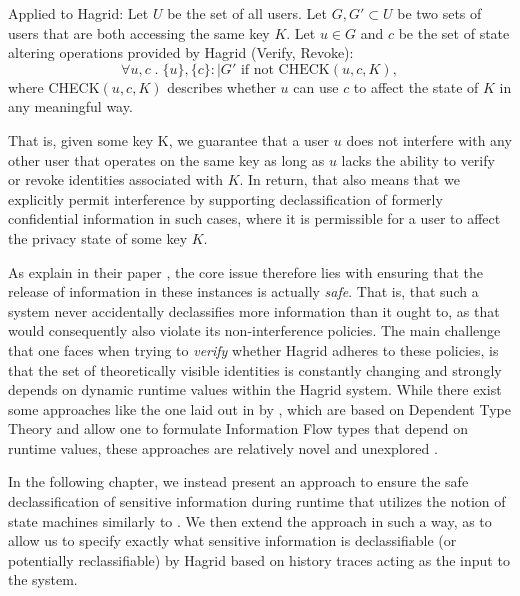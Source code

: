 Applied to Hagrid: Let \(U\) be the set of all users. Let \(G,G' \subset U\) be two sets of users that are both accessing the same key \(K\). Let \(u \in G\) and \(c\) be the set of state altering operations provided by Hagrid (Verify, Revoke): 
\[
    \forall u,c \;.\; \{u\}, \{c\} :\mid G' \text{ if not } \text{CHECK}(u,c,K),
\]
where CHECK\((u,c,K)\) describes whether \(u\) can use \(c\) to affect the state of \(K\) in any meaningful way.

That is, given some key K, we guarantee that a user \(u\) does not interfere with any other user that operates on the same key as long as \(u\) lacks the ability to verify or revoke identities associated with \(K\). 
In return, that also means that we explicitly permit interference by supporting declassification of formerly confidential information in such cases, where it is permissible for a user to affect the privacy state of some key \(K\).

As \citeauthor{declass_dim_prin} explain in their paper , the core issue therefore lies with ensuring that the release of information in these instances is actually \emph{safe}\cite{declass_dim_prin}. That is, that such a system never accidentally declassifies more information than it ought to, as that would consequently also violate its non-interference policies.
The main challenge that one faces when trying to \emph{verify} whether Hagrid adheres to these policies, is that the set of theoretically visible identities is constantly changing and strongly depends on dynamic runtime values within the Hagrid system. 
While there exist some approaches like the one laid out in  by \citeauthor{Lourenco_Caires_15}, which are based on Dependent Type Theory and allow one to formulate Information Flow types that depend on runtime values, these approaches are relatively novel and unexplored \cite{Lourenco_Caires_15}.

In the following chapter, we instead present an approach to ensure the safe declassification of sensitive information during runtime that utilizes the notion of state machines similarly to \citeauthor{Goguen_Meseguer_82}. We then extend the approach in such a way, as to allow us to specify exactly what sensitive information is declassifiable (or potentially reclassifiable) by Hagrid based on history traces acting as the input to the system.

